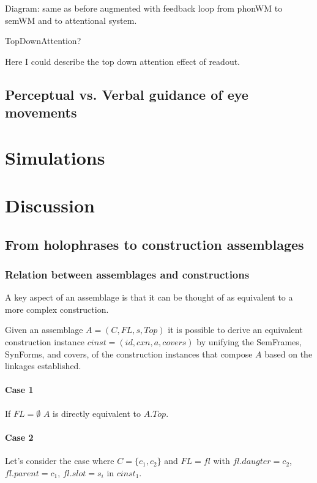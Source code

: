 \documentclass{article}
\begin{document}
Diagram: same as before augmented with feedback loop from phonWM to semWM and to attentional system.

\begin{algorithm}
\caption{TopDownAttention?}
\label{tdattention}
\begin{algorithmic}
	\STATE Here I could describe the top down attention effect of readout.
\end{algorithmic}
\end{algorithm}

\subsection{Perceptual vs. Verbal guidance of eye movements}

\section{Simulations}

\section{Discussion}
\subsection{From holophrases to construction assemblages}

\subsubsection{Relation between assemblages and constructions}
A key aspect of an assemblage is that it can be thought of as equivalent to a more complex construction.

Given an assemblage $A = (C, FL, s, Top)$ it is possible to derive an equivalent construction instance $cinst = (id, cxn, a, covers)$ by unifying the SemFrames, SynForms, and covers, of the construction instances that compose $A$ based on the linkages established.
\paragraph{Case 1}
If $FL = \emptyset$ $A$ is directly equivalent to $A.Top$.
\paragraph{Case 2}
Let's consider the case where $C = \lbrace c_1, c_2 \rbrace$ and $FL = {fl}$ with $fl.daugter = c_2$, $fl.parent = c_1$, $fl.slot = s_i$ in $cinst_1$.
\end{document}
